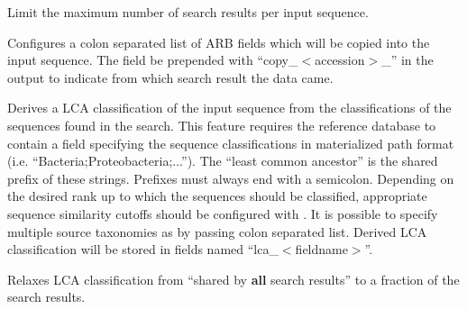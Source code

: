\documentclass[english,a4paper]{article}
\begin{document}
\begin{Description}
Limit the maximum number of search results per input sequence.
\item[\OptArg{-{}-search-copy-fields }{fieldnames}]
Configures a colon separated list of ARB fields which will be copied into the input sequence. The field 
be prepended with ``copy\_$<$accession$>$\_'' in the output to indicate from which search result
the data came. 
\item[\OptArg{-{}-lca-fields }{fieldnames}]
Derives a LCA classification of the input sequence from the classifications of the sequences found in the search. This feature requires the reference database to contain a field specifying the sequence classifications in 
materialized path format (i.e. ``Bacteria;Proteobacteria;...''). The ``least common ancestor'' is the shared 
prefix of these strings. Prefixes must always end with a semicolon. Depending on the desired rank up to 
which the sequences should be classified, appropriate sequence similarity cutoffs should be configured with
. It is possible to specify multiple source taxonomies as  by passing colon
separated list. Derived LCA classification will be stored in fields named ``lca\_$<$fieldname$>$''. 
\item[\OptArg{-{}-lca-quorum }{value}]
Relaxes LCA classification from ``shared by \textbf{all} search results'' 
to a fraction  of the search results. 
\end{Description}
\end{document}
